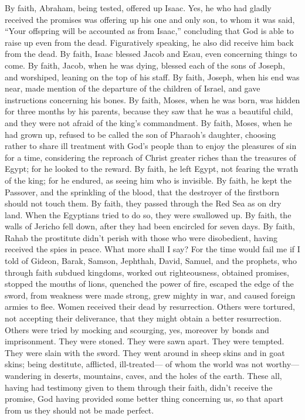 {\par }{\PP {}By faith, Abraham, being tested, offered up Isaac. Yes, he who had gladly received the promises was offering up his one and only son,
to whom it was said, “Your offspring will be accounted as from Isaac,”
concluding that God is able to raise up even from the dead. Figuratively speaking, he also did receive him back from the dead.
By faith, Isaac blessed Jacob and Esau, even concerning things to come.
By faith, Jacob, when he was dying, blessed each of the sons of Joseph, and worshiped, leaning on the top of his staff.
By faith, Joseph, when his end was near, made mention of the departure of the children of Israel, and gave instructions concerning his bones.
By faith, Moses, when he was born, was hidden for three months by his parents, because they saw that he was a beautiful child, and they were not afraid of the king’s commandment.
By faith, Moses, when he had grown up, refused to be called the son of Pharaoh’s daughter,
choosing rather to share ill treatment with God’s people than to enjoy the pleasures of sin for a time,
considering the reproach of Christ greater riches than the treasures of Egypt; for he looked to the reward.
By faith, he left Egypt, not fearing the wrath of the king; for he endured, as seeing him who is invisible.
By faith, he kept the Passover, and the sprinkling of the blood, that the destroyer of the firstborn should not touch them.
By faith, they passed through the Red Sea as on dry land. When the Egyptians tried to do so, they were swallowed up.
By faith, the walls of Jericho fell down, after they had been encircled for seven days.
By faith, Rahab the prostitute didn’t perish with those who were disobedient, having received the spies in peace.
What more shall I say? For the time would fail me if I told of Gideon, Barak, Samson, Jephthah, David, Samuel, and the prophets,
who through faith subdued kingdoms, worked out righteousness, obtained promises, stopped the mouths of lions,
quenched the power of fire, escaped the edge of the sword, from weakness were made strong, grew mighty in war, and caused foreign armies to flee.
Women received their dead by resurrection. Others were tortured, not accepting their deliverance, that they might obtain a better resurrection.
Others were tried by mocking and scourging, yes, moreover by bonds and imprisonment.
They were stoned. They were sawn apart. They were tempted. They were slain with the sword. They went around in sheep skins and in goat skins; being destitute, afflicted, ill-treated—
of whom the world was not worthy—wandering in deserts, mountains, caves, and the holes of the earth.
These all, having had testimony given to them through their faith, didn’t receive the promise,
God having provided some better thing concerning us, so that apart from us they should not be made perfect.

}
